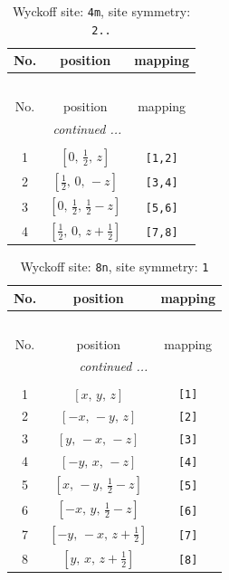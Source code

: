 \documentclass[fleqn,8pt]{jsarticle}
\begin{document}
\renewcommand{\arraystretch}{1.2}
\begin{longtable}{ccc}
\caption{Wyckoff site: {\tt 4m}, site symmetry: {\tt 2..}}
 \\
 \hline \hline
No. & position & mapping \\ \hline \endfirsthead

\multicolumn{2}{l}{\tablename\ \thetable{}} \\
 \hline \hline
No. & position & mapping \\ \hline \endhead

 \hline \hline
\multicolumn{2}{r}{\footnotesize\it continued ...} \\ \endfoot

 \hline \hline
\multicolumn{2}{r}{} \\ \endlastfoot

1 & $\left[ 0,\, \frac{1}{2},\, z \right]$ & {\tt [1,2]} \\ \hline
2 & $\left[ \frac{1}{2},\, 0,\, - z \right]$ & {\tt [3,4]} \\ \hline
3 & $\left[ 0,\, \frac{1}{2},\, \frac{1}{2} - z \right]$ & {\tt [5,6]} \\ \hline
4 & $\left[ \frac{1}{2},\, 0,\, z + \frac{1}{2} \right]$ & {\tt [7,8]} \\
\end{longtable}
\renewcommand{\arraystretch}{1.2}
\begin{longtable}{ccc}
\caption{Wyckoff site: {\tt 8n}, site symmetry: {\tt 1}}
 \\
 \hline \hline
No. & position & mapping \\ \hline \endfirsthead

\multicolumn{2}{l}{\tablename\ \thetable{}} \\
 \hline \hline
No. & position & mapping \\ \hline \endhead

 \hline \hline
\multicolumn{2}{r}{\footnotesize\it continued ...} \\ \endfoot

 \hline \hline
\multicolumn{2}{r}{} \\ \endlastfoot

1 & $\left[ x,\, y,\, z \right]$ & {\tt [1]} \\ \hline
2 & $\left[ - x,\, - y,\, z \right]$ & {\tt [2]} \\ \hline
3 & $\left[ y,\, - x,\, - z \right]$ & {\tt [3]} \\ \hline
4 & $\left[ - y,\, x,\, - z \right]$ & {\tt [4]} \\ \hline
5 & $\left[ x,\, - y,\, \frac{1}{2} - z \right]$ & {\tt [5]} \\ \hline
6 & $\left[ - x,\, y,\, \frac{1}{2} - z \right]$ & {\tt [6]} \\ \hline
7 & $\left[ - y,\, - x,\, z + \frac{1}{2} \right]$ & {\tt [7]} \\ \hline
8 & $\left[ y,\, x,\, z + \frac{1}{2} \right]$ & {\tt [8]} \\
\end{longtable}
\end{document}

